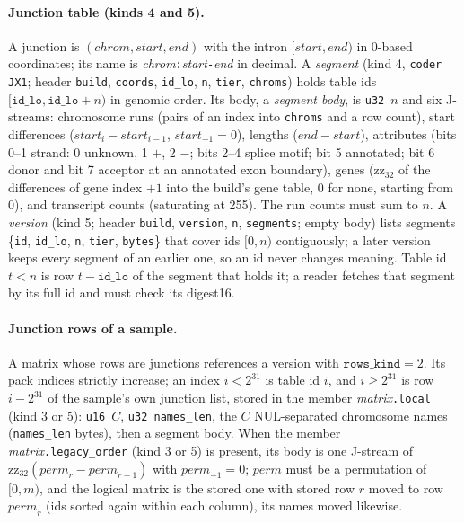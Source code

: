 \paragraph{Junction table (kinds 4 and 5).}
\label{spec:junctions}
A junction is $(\mathit{chrom},\mathit{start},\mathit{end})$ with the intron $[\mathit{start},\mathit{end})$ in
0-based coordinates; its name is \emph{chrom}\texttt{:}\emph{start}\texttt{-}\emph{end} in decimal. A \emph{segment}
(kind 4, \texttt{coder} \texttt{JX1}; header \texttt{build}, \texttt{coords}, \texttt{id\_lo}, \texttt{n},
\texttt{tier}, \texttt{chroms}) holds table ids $[\texttt{id\_lo},\texttt{id\_lo}+n)$ in genomic order. Its body, a
\emph{segment body}, is \texttt{u32}~$n$ and six J-streams: chromosome runs (pairs of an index into \texttt{chroms} and
a row count), start differences ($\mathit{start}_i-\mathit{start}_{i-1}$, $\mathit{start}_{-1}=0$), lengths
($\mathit{end}-\mathit{start}$), attributes (bits 0--1 strand: 0 unknown, 1 $+$, 2 $-$; bits 2--4 splice motif; bit 5
annotated; bit 6 donor and bit 7 acceptor at an annotated exon boundary), genes ($\mathrm{zz}_{32}$ of the differences
of gene index $+1$ into the build's gene table, 0 for none, starting from 0), and transcript counts (saturating at
255). The run counts must sum to $n$. A \emph{version} (kind 5; header \texttt{build}, \texttt{version}, \texttt{n},
\texttt{segments}; empty body) lists segments \{\texttt{id}, \texttt{id\_lo}, \texttt{n}, \texttt{tier},
\texttt{bytes}\} that cover ids $[0,n)$ contiguously; a later version keeps every segment of an earlier one, so an id
never changes meaning. Table id $t<n$ is row $t-\texttt{id\_lo}$ of the segment that holds it; a reader fetches that
segment by its full id and must check its digest16.

\paragraph{Junction rows of a sample.}
A matrix whose rows are junctions references a version with $\texttt{rows\_kind}=2$. Its pack indices strictly
increase; an index $i<2^{31}$ is table id $i$, and $i\ge2^{31}$ is row $i-2^{31}$ of the sample's own junction list,
stored in the member \emph{matrix}\texttt{.local} (kind 3 or 5): \texttt{u16}~$C$, \texttt{u32 names\_len}, the $C$
NUL-separated chromosome names (\texttt{names\_len} bytes), then a segment body. When the member
\emph{matrix}\texttt{.legacy\_order} (kind 3 or 5) is present, its body is one J-stream of
$\mathrm{zz}_{32}(\mathit{perm}_r-\mathit{perm}_{r-1})$ with $\mathit{perm}_{-1}=0$; $\mathit{perm}$ must be a
permutation of $[0,m)$, and the logical matrix is the stored one with stored row $r$ moved to row $\mathit{perm}_r$
(ids sorted again within each column), its names moved likewise.

